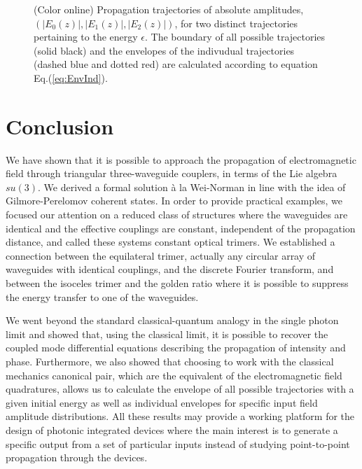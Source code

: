\documentclass[9pt,twocolumn,twoside]{osajnl}
\begin{document}
\begin{figure}[htbp]
	\centering
	\caption{(Color online) Propagation trajectories of absolute amplitudes, $(\vert E_{0}(z) \vert, \vert E_{1}(z) \vert, \vert E_{2}(z) \vert )$,  for two 
		distinct trajectories pertaining to the energy $\epsilon$. The boundary 
		of all possible trajectories (solid black) and the envelopes of the indivudual  trajectories (dashed blue and dotted red) are calculated according to equation Eq.(\ref{eq:EnvInd}).} 
	
	\label{fig:Fig6}
\end{figure}


\section{Conclusion}
We have shown that it is possible to approach the propagation of electromagnetic field through triangular three-waveguide couplers, in terms of the Lie algebra $su(3)$. 
We derived a formal solution \`a la Wei-Norman in line with the idea of Gilmore-Perelomov coherent states.
In order to provide practical examples, we focused our attention on a reduced class of structures where the waveguides are identical and the effective couplings are constant, independent of the propagation distance, and called these systems constant optical trimers. 
We established a connection between the equilateral trimer, actually any circular array of waveguides with identical couplings, and the discrete Fourier transform, and between the isoceles trimer and the golden ratio where it is possible to suppress the energy transfer to one of the waveguides. 

We went beyond the standard classical-quantum analogy in the single photon limit and showed that, using the classical limit, it is possible to recover the coupled mode differential equations describing the propagation of intensity and phase.
Furthermore, we also showed that choosing to work with the classical mechanics canonical pair, which are the equivalent of the electromagnetic field quadratures, allows us to calculate the envelope of all possible trajectories with a given initial energy as well as individual envelopes for specific input field amplitude distributions.
All these results may provide a working platform for the design of photonic integrated devices where the main interest is to generate a specific output from a set of particular inputs instead of studying point-to-point propagation through the devices.
\end{document}
